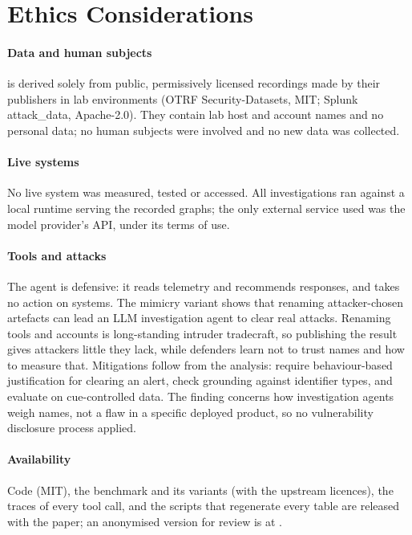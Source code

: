 \section{Ethics Considerations}
\label{sec:ethics}
\paragraph{Data and human subjects} \bench is derived solely from public, permissively licensed recordings made
by their publishers in lab environments (OTRF Security-Datasets, MIT; Splunk attack\_data, Apache-2.0). They
contain lab host and account names and no personal data; no human subjects were involved and no new data was
collected.

\paragraph{Live systems} No live system was measured, tested or accessed. All investigations ran against a
local runtime serving the recorded graphs; the only external service used was the model provider's API, under
its terms of use.

\paragraph{Tools and attacks} The agent is defensive: it reads telemetry and recommends responses, and takes no
action on systems. The mimicry variant shows that renaming attacker-chosen artefacts can lead an LLM
investigation agent to clear real attacks. Renaming tools and accounts is long-standing intruder tradecraft,
so publishing the result gives attackers little they lack, while defenders learn not to trust names and how to
measure that. Mitigations follow from the analysis: require behaviour-based justification for clearing an
alert, check grounding against identifier types, and evaluate on cue-controlled data. The finding concerns how
investigation agents weigh names, not a flaw in a specific deployed product, so no vulnerability disclosure
process applied.

\paragraph{Availability} Code (MIT), the benchmark and its variants (with the upstream licences), the traces of
every tool call, and the scripts that regenerate every table are released with the paper\ifconf; an
anonymised version for review is at \ArtifactURL\fi.

